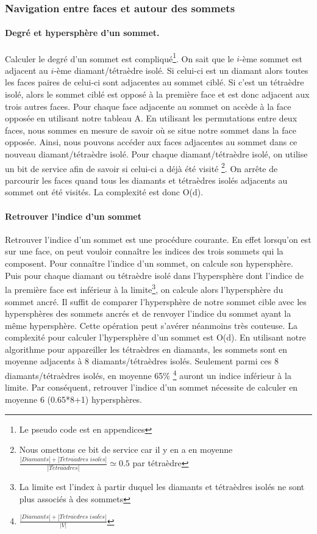 \subsubsection{Navigation entre faces et autour des sommets}
\paragraph{Degré et hypersphère d'un sommet.}
\noindent
Calculer le degré d'un sommet est compliqué\footnote{Le pseudo code est en appendices}. On sait que le $i$-ème sommet est adjacent au $i$-ème diamant/tétraèdre isolé. Si celui-ci est un diamant alors toutes les faces paires de celui-ci sont adjacentes au sommet ciblé. Si c'est un tétraèdre isolé, alors le sommet ciblé est opposé à la première face et est donc adjacent aux trois autres faces. Pour chaque face adjacente au sommet on accède à la face opposée en utilisant notre tableau A. En utilisant les permutations entre deux faces, nous sommes en mesure de savoir où se situe notre sommet dans la face opposée. Ainsi, nous pouvons accéder aux faces adjacentes au sommet dans ce nouveau diamant/tétraèdre isolé. Pour chaque diamant/tétraèdre isolé, on utilise un bit de service afin de savoir si celui-ci a déjà été visité \footnote{Nous omettons ce bit de service car il y en a en moyenne $\frac{|Diamants| + |T\acute{e}tra\grave{a}dres \; isol\acute{e}s|}{|T\acute{e}tra\grave{a}dres|}\simeq 0.5$ par tétraèdre}. On arrête de parcourir les faces quand tous les diamants et tétraèdres isolés adjacents au sommet ont été visités. La complexité est donc O(d).

\paragraph{Retrouver l'indice d'un sommet}\label{Retrouver l'indice d'un sommet}
\noindent
Retrouver l'indice d'un sommet est une procédure courante. En effet lorsqu'on est sur une face, on peut vouloir connaître les indices des trois sommets qui la composent. Pour connaître l'indice d'un sommet, on calcule son hypersphère. Puis pour chaque diamant ou tétraèdre isolé dans l'hypersphère dont l'indice de la première face est inférieur à la limite\footnote{La limite est l'index à partir duquel les diamants et tétraèdres isolés ne sont plus associés à des sommets}, on calcule alors l'hypersphère du sommet ancré. Il suffit de comparer l'hypersphère de notre sommet cible avec les hypersphères des sommets ancrés et de renvoyer l'indice du sommet ayant la même hypersphère. Cette opération peut s'avérer néanmoins très couteuse. La complexité pour calculer l'hypersphère d'un sommet est O(d). En utilisant notre algorithme pour appareiller les tétraèdres en diamants, les sommets sont en moyenne adjacents à 8 diamants/tétraèdres isolés. Seulement parmi ces 8 diamants/tétraèdres isolés, en moyenne 65\% \footnote{$\frac{|Diamants|+|T\acute{e}tra\grave{e}dres\; isol\acute{e}s|}{|V|}$} auront un indice inférieur à la limite. Par conséquent, retrouver l'indice d'un sommet nécessite de calculer en moyenne 6 (0.65*8+1) hypersphères.

